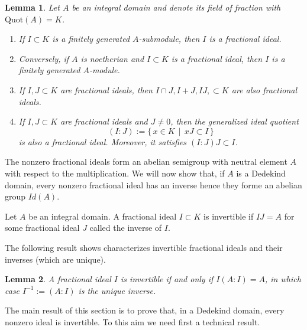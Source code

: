 \documentclass[a4paper]{book}
\theoremstyle{break}
\theoremstyle{plain}
\newtheorem{lemma}{Lemma}[definition]
\begin{document}
\begin{lemma}
    Let \(A\) be an integral domain and denote its field of fraction with \(\text{Quot}(A) = K\).
    \begin{enumerate}
        \item If \(I \subset K\) is a finitely generated \(A\)-submodule, then \(I\) is a fractional ideal.
        \item Conversely, if \(A\) is noetherian and \(I \subset K\) is a fractional ideal, then \(I\) is a finitely generated \(A\)-module.
        \item If \(I, J \subset K\) are fractional ideals, then \(I \cap J, I + J, IJ, \subset K\) are also fractional ideals.
        \item If \(I, J \subset K\) are fractional ideals and \(J \neq {0}\), then the generalized ideal quotient
        \begin{equation}
            (I : J) := \{\, x \in K \, \mid \, xJ \subset I \,\}
        \end{equation}
        is also a fractional ideal. Moreover, it satisfies \((I : J)J \subset I\).
    \end{enumerate}
\end{lemma}

The nonzero fractional ideals form an abelian semigroup with neutral element \(A\) with respect to the multiplication. We will now show that, if \(A\) is a Dedekind domain, every nonzero fractional ideal has an inverse hence they forme an abelian group \(Id (A)\).

\begin{definition}
    Let \(A\) be an {\color{mathif}integral domain}. A {\color{mathif}fractional ideal} \(I \subset K\) is {\color{maththen}invertible} if \(IJ = A\) for some fractional ideal \(J\) called the {\color{mathrem}inverse} of \(I\).
\end{definition}

The following result shows characterizes invertible fractional ideals and their inverses (which are unique).

\begin{lemma}
    A fractional ideal \(I\) is invertible if and only if \(I (A : I) = A\), in which case \(I^{-1} := (A : I)\) is the unique inverse.
\end{lemma}


The main result of this section is to prove that, in a Dedekind domain, every nonzero ideal is invertible. To this aim we need first a technical result.
\end{document}
